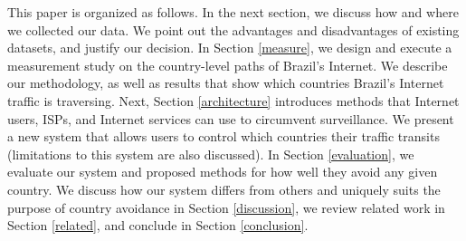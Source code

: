 This paper is organized as follows.   In the next section, we discuss how and where we collected our data.  We point out the advantages and disadvantages of existing datasets, and justify our decision.  In Section \ref{measure}, we design and execute a measurement study on the country-level paths of Brazil's Internet.  We describe our methodology, as well as results that show which countries Brazil's Internet traffic is traversing.  Next, Section \ref{architecture} introduces methods that Internet users, ISPs, and Internet services can use to circumvent surveillance.  We present a new system that allows users to control which countries their traffic transits (limitations to this system are also discussed).  In Section \ref{evaluation}, we evaluate our system and proposed methods for how well they avoid any given country.  We discuss how our system differs from others and uniquely suits the purpose of country avoidance in Section \ref{discussion}, we review related work in Section \ref{related}, and conclude in Section \ref{conclusion}.
